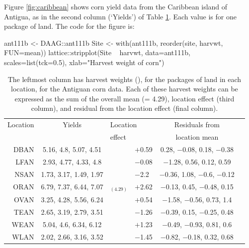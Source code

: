 Figure \ref{fig:caribbean} shows corn yield data from the Caribbean island of
Antigua, as in the second column (`Yields') of Table \ref{tab:ant111b}.
Each value is for one package of land.
The code for the figure is:
\begin{Schunk}
\begin{Sinput}
ant111b <- DAAG::ant111b
Site <- with(ant111b, reorder(site, harvwt,
                              FUN=mean))
lattice::stripplot(Site ~ harvwt, data=ant111b,
          scales=list(tck=0.5),
          xlab="Harvest weight of corn")
\end{Sinput}
\end{Schunk}

\begin{table}
\begin{center}
{\small
\begin{tabular}{@{}rc||r@{\hspace{1mm}}lcc@{}}
\hline
\multicolumn{1}{c}{Location}  & \multicolumn{1}{c}{Yields}  &
\multicolumn{2}{l}{Location} & Residuals from\\
 & & \multicolumn{2}{l}{effect} & \multicolumn{1}{c}{location mean}\\
\hline
DBAN &  5.16, 4.8, 5.07, 4.51 &  \vline& $+$0.59 & 0.28, $-$0.08, 0.18, $-$0.38 \\
LFAN &  2.93, 4.77, 4.33, 4.8 &  \vline& $-$0.08 &  $-$1.28, 0.56, 0.12, 0.59 \\
NSAN & 1.73, 3.17, 1.49, 1.97 &  \vline& $-$2.2 & $-$0.36, 1.08, $-$0.6, $-$0.12 \\
ORAN & 6.79, 7.37, 6.44, 7.07 & $_{(4.29)} $ \vline& $+$2.62 & $-$0.13, 0.45, $-$0.48, 0.15 \\
OVAN & 3.25, 4.28, 5.56, 6.24 &  \vline& $+$0.54 &  $-$1.58, $-$0.56, 0.73, 1.4 \\
TEAN & 2.65, 3.19, 2.79, 3.51 &  \vline& $-$1.26 & $-$0.39, 0.15, $-$0.25, 0.48 \\
WEAN &  5.04, 4.6, 6.34, 6.12 &  \vline& $+$1.23 &  $-$0.49, $-$0.93, 0.81, 0.6 \\
WLAN & 2.02, 2.66, 3.16, 3.52 &  \vline& $-$1.45 & $-$0.82, $-$0.18, 0.32, 0.68 \\
\hline
\end{tabular}
}
\caption{The leftmost column has harvest weights (), for
  the packages of land in each location, for the Antiguan corn data.  Each of
  these harvest weights can be expressed as the sum of the overall
  mean (= 4.29), location effect (third column), and residual from the
  location effect (final column).
\label{tab:ant111b}}
\end{center}
\vspace*{-0pt}
\end{table}
\vspace*{3pt}

